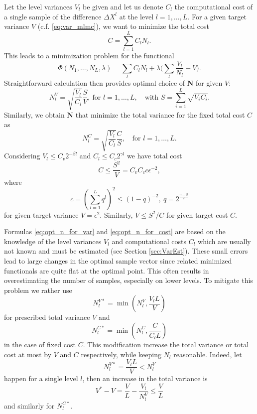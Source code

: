 \documentclass{article}
\def\vc#1{\mathbf{\boldsymbol{#1}}}     %
\begin{document}
Let  the level variances $V_l$ be given and let us denote $C_l$ the computational cost of a single sample of the difference $\Delta X^l$ at the level $l=1,\dots, L$. For a given target variance $V$ (c.f. \eqref{eq:var_mlmc}), we want to minimize the total cost
\begin{equation}
    \label{eq:total_cost}
	C = \sum_{l=1}^{L} C_l N_l.
\end{equation}
This leads to a minimization problem for the functional
\[
	\Phi(N_1, \dots, N_L,\lambda) = \sum_l C_l N_l + \lambda \Big(\sum_l \frac{V_l}{N_l} - V\Big).
\]
Straightforward calculation then provides optimal choice of $\vc N$ for given $V$:
\begin{equation}
	\label{eq:opt_n_for_var}
	N_l^V = \sqrt{\frac{V_l}{C_l}} \frac{S}{V},\ \text{for }l=1,\dots, L,\quad \text{with } S = \sum_{i=1}^L \sqrt{V_i C_i}.
\end{equation}
Similarly, we obtain $\vc N$ that minimize the total variance for the fixed total cost $C$ as
\begin{equation}
	\label{eq:opt_n_for_cost}
	N_l^C = \sqrt{\frac{V_l}{C_l}} \frac{C}{S}
	, \quad \text{for }l=1,\dots, L.
\end{equation}
Considering $V_l \le C_{v} 2^{-\beta l}$ and $C_l \le C_{c} 2^{\gamma l}$ we have total cost
\[
   C \le \frac{S^2}{V} = C_v C_c c \epsilon^{-2},
\]
where 
\[ 
   c = \left(\sum_{l=1}^{L} q^l\right)^2 \le (1-q)^{-2},\ q=2^\frac{\gamma - \beta}{2}
\]
for given target variance $V=\epsilon^2$. Similarly, $V \le S^2 / C$ for given target cost $C$.



Formulas \eqref{eq:opt_n_for_var} and \eqref{eq:opt_n_for_cost} are based on the knowledge of the level variances $V_l$ and computational costs $C_l$ which are usually not known and must be estimated (see Section \ref{sec:VarEst}). These small errors lead to large changes in the optimal sample vector since related minimized functionals are quite flat at the optimal point.  This often results in overestimating the number of samples, especially on lower levels. To mitigate this problem we rather use
\[
	N_l^{V*} = \min( N_l^V, \frac{V_l L}{V} )
\]
for prescribed total variance $V$ and
\[
	N_l^{C*} = \min( N_l^C, \frac{C}{C_l L} )
\]
in the case of fixed cost $C$. This modification increase the total variance or total cost at most by $V$ and $C$ respectively, while keeping  $N_l$ reasonable. Indeed, let
\[
	N_l^{V*} = \frac{V_l L}{V} < N_l^V 
\]
happen for a single level $l$, then an increase in the total variance is
\[
    V^* - V = \frac{V}{L} - \frac{V_l}{N_l^V} \le \frac{V}{L}
\]
and similarly for $N_l^{C*}$.
\end{document}
